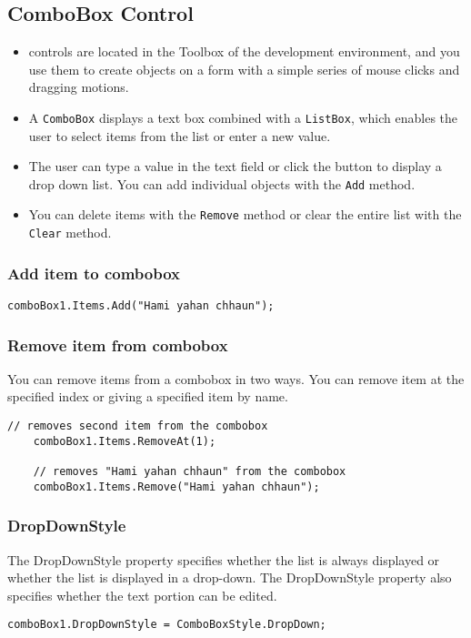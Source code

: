 \subsection{ComboBox Control }
\begin{itemize}
	\item {\cs} controls are located in the Toolbox of the development environment, and you use them to create objects on a form with a simple series of mouse clicks and dragging motions. 
	\item A \texttt{ComboBox} displays a text box combined with a \texttt{ListBox}, which enables the user to select items from the list or enter a new value.
	\item The user can type a value in the text field or click the button to display a drop down list. You can add individual objects with the \texttt{Add} 	method. 
	\item You can delete items with the \texttt{Remove} method or clear the entire list with the \texttt{Clear} method.
\end{itemize}


\subsubsection*{Add item to combobox}
\begin{lstlisting}[numbers=none]
	comboBox1.Items.Add("Hami yahan chhaun");
\end{lstlisting}

\subsubsection*{Remove item from combobox}
You can remove items from a combobox in two ways. You can remove item at the specified index or giving a specified item by name.

\begin{lstlisting}[numbers=none]
	// removes second item from the combobox
	comboBox1.Items.RemoveAt(1);
	
	// removes "Hami yahan chhaun" from the combobox
	comboBox1.Items.Remove("Hami yahan chhaun");
\end{lstlisting}

\subsubsection*{DropDownStyle }
The DropDownStyle property specifies whether the list is always displayed or whether the list is displayed in a drop-down. The DropDownStyle property also specifies whether the text portion can be edited.
\begin{lstlisting}[numbers=none]
	comboBox1.DropDownStyle = ComboBoxStyle.DropDown;
\end{lstlisting}

